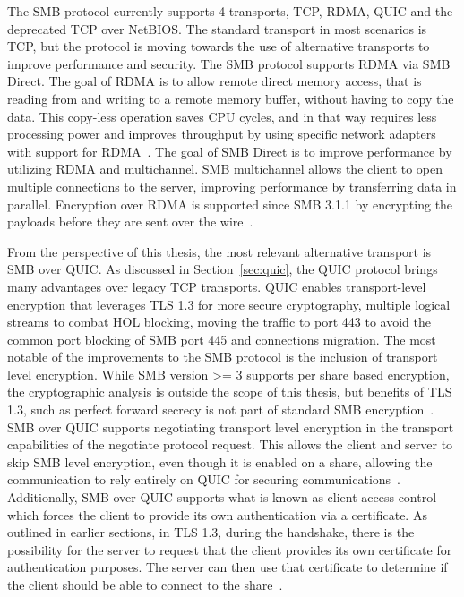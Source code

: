 \documentclass[english, 12pt, a4paper, elec, utf8, a-2b, online]{aaltothesis}
\begin{document}
The SMB protocol currently supports 4 transports, TCP, RDMA, QUIC and the
deprecated TCP over NetBIOS. The standard transport in most scenarios is TCP,
but the protocol is moving towards the use of alternative transports to improve
performance and security. The SMB protocol supports RDMA via SMB Direct. The goal
of RDMA is to allow remote direct memory access, that is reading from and writing
to a remote memory buffer, without having to copy the data. This copy-less operation saves CPU
cycles, and in that way requires less processing power and improves throughput
by using specific network adapters with support for RDMA~\cite{rfc5040}.
The goal of SMB Direct is to improve performance by utilizing RDMA
and multichannel. SMB multichannel allows the client to open multiple connections
to the server, improving performance by transferring data in parallel. Encryption over
RDMA is supported since SMB 3.1.1 by encrypting the payloads before they are sent over the
wire~\cite{smb_direct}.

From the perspective of this thesis, the most relevant alternative transport is
SMB over QUIC. As discussed in Section~\ref{sec:quic}, the QUIC protocol brings
many advantages over legacy TCP transports. QUIC enables transport-level encryption
that leverages TLS 1.3 for more secure cryptography, multiple logical streams
to combat HOL blocking, moving the traffic to port 443 to avoid the common port
blocking of SMB port 445 and connections migration. The most notable of the improvements to the
SMB protocol is the inclusion of transport level encryption. While SMB version >= 3
supports per share based encryption, the cryptographic analysis is outside the scope
of this thesis, but benefits of TLS 1.3, such as perfect forward secrecy is not
part of standard SMB encryption~\cite{smb_quic}. SMB over QUIC supports negotiating
transport level encryption in the transport capabilities of the negotiate protocol
request. This allows the client and server to skip SMB level encryption, even though
it is enabled on a share, allowing the communication to rely entirely on QUIC for
securing communications~\cite{smb2_tech}. Additionally, SMB over QUIC supports what is
known as client access control which forces the client to provide its own authentication
via a certificate. As outlined in earlier sections, in TLS 1.3,
during the handshake,  there is the possibility for the server to request that the client
provides its own certificate for authentication purposes. The server can then use
that certificate to determine if the client should be able to connect to the share~\cite{smb_quic_cac}.
\end{document}

